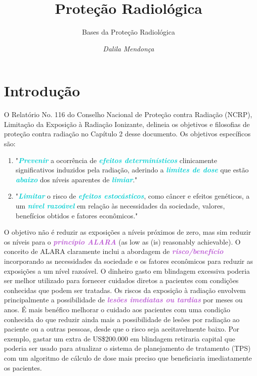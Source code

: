 \documentclass[11pt,a4paper]{article}
\title{\LobsterTwo\Huge{Proteção Radiológica}}
\author{\LobsterTwo\Large{Bases da Proteção Radiológica}\nocite{*}}
\date{\LobsterTwo\textit{Dalila Mendonça}}
\newcounter{exemplo}
\begin{document}
	\maketitle

\section{Introdução}

	O Relatório No. 116 do Conselho Nacional de Proteção contra Radiação (NCRP), Limitação da Exposição à Radiação Ionizante, delineia os objetivos e filosofias de proteção contra radiação no Capítulo 2 desse documento. Os objetivos específicos são:

	\begin{enumerate}[label=\textcolor{CarnationPink}{\arabic*${}^\circ$}]
		\item "\textcolor{DarkTurquoise}{\textbf{\textit{Prevenir}}} a ocorrência de \textcolor{DarkTurquoise}{\textbf{\textit{efeitos determinísticos}}} clinicamente significativos induzidos pela radiação, aderindo a \textcolor{DarkTurquoise}{\textbf{\textit{limites de dose}}} que estão \textcolor{DarkTurquoise}{\textbf{\textit{abaixo}}} dos níveis aparentes de \textcolor{DarkTurquoise}{\textbf{\textit{limiar}}}."
		\item "\textcolor{DarkTurquoise}{\textbf{\textit{Limitar}}} o risco de \textcolor{DarkTurquoise}{\textbf{\textit{efeitos estocásticos}}}, como câncer e efeitos genéticos, a um \textcolor{DarkTurquoise}{\textbf{\textit{nível razoável}}} em relação às necessidades da sociedade, valores, benefícios obtidos e fatores econômicos."
	\end{enumerate}

	O objetivo não é reduzir as exposições a níveis próximos de zero, mas sim reduzir os níveis para o \textcolor{MediumOrchid}{\textbf{\textit{princípio ALARA}}} (as low as (is) reasonably achievable). O conceito de ALARA claramente inclui a abordagem de \textcolor{MediumOrchid}{\textbf{\textit{risco/benefício}}} incorporando as necessidades da sociedade e os fatores econômicos para reduzir as exposições a um nível razoável. O dinheiro gasto em blindagem excessiva poderia ser melhor utilizado para fornecer cuidados diretos a pacientes com condições conhecidas que podem ser tratadas. Os riscos da exposição à radiação envolvem principalmente a possibilidade de \textcolor{MediumOrchid}{\textbf{\textit{lesões imediatas ou tardias}}} por meses ou anos. É mais benéfico melhorar o cuidado aos pacientes com uma condição conhecida do que reduzir ainda mais a possibilidade de lesões por radiação ao paciente ou a outras pessoas, desde que o risco seja aceitavelmente baixo. Por exemplo, gastar um extra de US\$200.000 em blindagem retiraria capital que poderia ser usado para atualizar o sistema de planejamento de tratamento (TPS) com um algoritmo de cálculo de dose mais preciso que beneficiaria imediatamente os pacientes.
\end{document}

